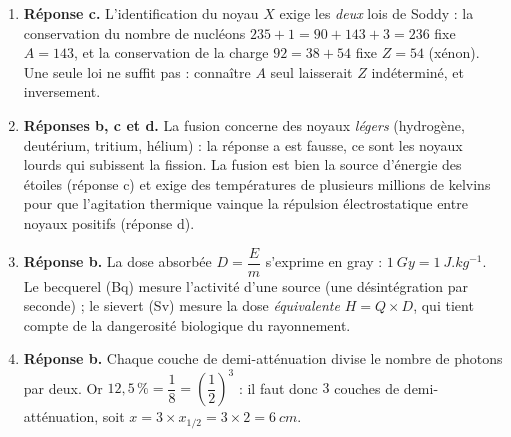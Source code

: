 \documentclass[11pt]{article}
\begin{document}
\begin{corrige}
\begin{enumerate}
\item \textbf{Réponse c.} L'identification du noyau $X$ exige les \emph{deux} lois de Soddy : la conservation du nombre de nucléons $235 + 1 = 90 + 143 + 3 = 236$ fixe $A = 143$, et la conservation de la charge $92 = 38 + 54$ fixe $Z = 54$ (xénon). Une seule loi ne suffit pas : connaître $A$ seul laisserait $Z$ indéterminé, et inversement.
\item \textbf{Réponses b, c et d.} La fusion concerne des noyaux \emph{légers} (hydrogène, deutérium, tritium, hélium) : la réponse a est fausse, ce sont les noyaux lourds qui subissent la fission. La fusion est bien la source d'énergie des étoiles (réponse c) et exige des températures de plusieurs millions de kelvins pour que l'agitation thermique vainque la répulsion électrostatique entre noyaux positifs (réponse d).
\item \textbf{Réponse b.} La dose absorbée $D = \dfrac{E}{m}$ s'exprime en gray : $\SI{1}{Gy} = \SI{1}{J.kg^{-1}}$. Le becquerel (Bq) mesure l'activité d'une source (une désintégration par seconde) ; le sievert (Sv) mesure la dose \emph{équivalente} $H = Q \times D$, qui tient compte de la dangerosité biologique du rayonnement.
\item \textbf{Réponse b.} Chaque couche de demi-atténuation divise le nombre de photons par deux. Or $12,5\,\% = \dfrac{1}{8} = \left(\dfrac{1}{2}\right)^3$ : il faut donc $3$ couches de demi-atténuation, soit $x = 3 \times x_{1/2} = 3 \times 2 = \SI{6}{cm}$.
\end{enumerate}
\end{corrige}
\end{document}
